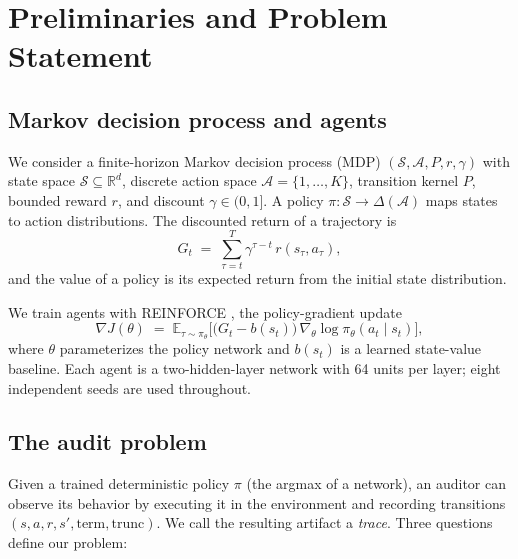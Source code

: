 \documentclass[11pt]{article}
\begin{document}
\section{Preliminaries and Problem Statement}
\label{sec:prelim}

\subsection{Markov decision process and agents}
\label{sec:prelim:mdp}

We consider a finite-horizon Markov decision process (MDP) $(\mathcal{S},\mathcal{A},P,r,\gamma)$
with state space $\mathcal{S}\subseteq\mathbb{R}^{d}$, discrete action space
$\mathcal{A}=\{1,\ldots,K\}$, transition kernel $P$, bounded reward $r$, and discount
$\gamma\in(0,1]$. A policy $\pi\colon \mathcal{S}\to\Delta(\mathcal{A})$ maps states to action
distributions. The discounted return of a trajectory is
\begin{equation}
G_t \;=\; \sum_{\tau=t}^{T} \gamma^{\tau-t}\, r(s_\tau,a_\tau),
\label{eq:return}
\end{equation}
and the value of a policy is its expected return from the initial state distribution.

We train agents with REINFORCE \cite{williams1992simple}, the policy-gradient update
\begin{equation}
\nabla J(\theta) \;=\; \mathbb{E}_{\tau\sim\pi_\theta}\Big[\big(G_t - b(s_t)\big)\,\nabla_\theta \log \pi_\theta(a_t\mid s_t)\Big],
\label{eq:reinforce}
\end{equation}
where $\theta$ parameterizes the policy network and $b(s_t)$ is a learned state-value baseline.
Each agent is a two-hidden-layer network with 64 units per layer; eight independent seeds are used throughout.

\subsection{The audit problem}
\label{sec:prelim:audit}

Given a trained deterministic policy $\pi$ (the argmax of a network), an auditor can observe its
behavior by executing it in the environment and recording transitions
$(s,a,r,s',\mathrm{term},\mathrm{trunc})$. We call the resulting artifact a \emph{trace}. Three
questions define our problem:
\end{document}
